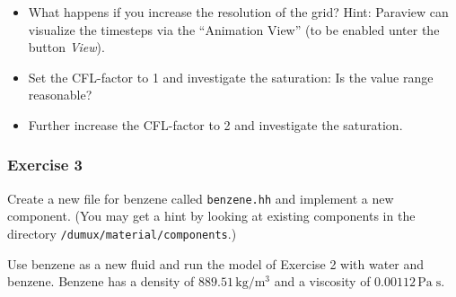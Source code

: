 \begin{itemize}
 \item What happens if you increase the resolution of the grid? Hint: Paraview can visualize the timesteps via the ``Animation View'' (to be enabled unter the button \textit{View}).
 \item Set the CFL-factor to 1 and investigate the saturation: Is the value range reasonable?
 \item Further increase the CFL-factor to 2 and investigate the saturation.
\end{itemize}

\subsubsection{Exercise 3}
Create a new file for benzene called \texttt{benzene.hh} and implement
a new component. (You may get a hint by looking at existing components
in the directory \verb+/dumux/material/components+.)

Use benzene as a new fluid and run the model of Exercise 2 with water
and benzene. Benzene has a density of $889.51 \, \text{kg} / \text{m}^3$
and a viscosity of $0.00112 \, \text{Pa} \; \text{s}$. 

